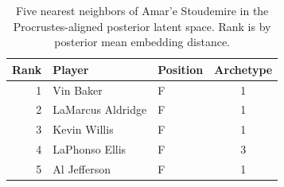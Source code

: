 \begin{table}[htbp]
  \centering\small
  \begin{tabular}{rllc}
    \toprule
    Rank & Player & Position & Archetype \\
    \midrule
    1 & Vin Baker & F & 1 \\
    2 & LaMarcus Aldridge & F & 1 \\
    3 & Kevin Willis & F & 1 \\
    4 & LaPhonso Ellis & F & 3 \\
    5 & Al Jefferson & F & 1 \\
    \bottomrule
  \end{tabular}
  \caption{Five nearest neighbors of Amar'e Stoudemire in the Procrustes-aligned posterior latent space. Rank is by posterior mean embedding distance.}
  \label{tab:Amar_e_Stoudemire_neighbors}
\end{table}

